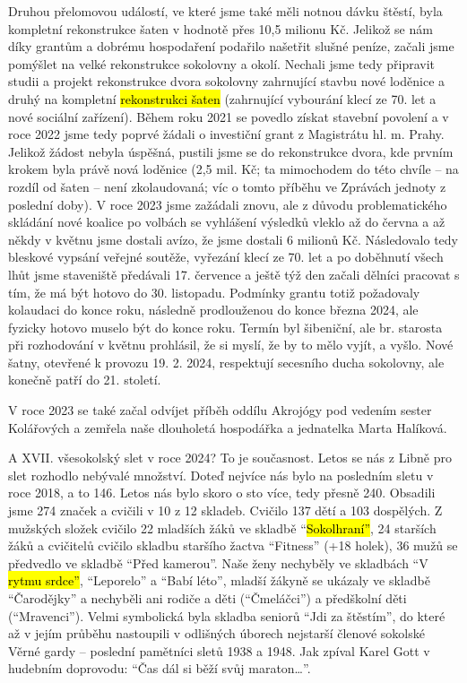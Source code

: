 Druhou přelomovou událostí, ve které jsme také měli notnou dávku štěstí,
byla kompletní rekonstrukce šaten v hodnotě přes 10,5 milionu Kč.
Jelikož se nám díky grantům a dobrému hospodaření podařilo našetřit
slušné peníze, začali jsme pomýšlet na velké rekonstrukce sokolovny a
okolí. Nechali jsme tedy připravit studii a projekt rekonstrukce dvora
sokolovny zahrnující stavbu nové loděnice a druhý na kompletní
\hl{rekonstrukci šaten} (zahrnující vybourání klecí ze 70. let a nové
sociální zařízení). Během roku 2021 se povedlo získat stavební povolení
a v roce 2022 jsme tedy poprvé žádali o investiční grant z Magistrátu
hl. m. Prahy. Jelikož žádost nebyla úspěšná, pustili jsme se do
rekonstrukce dvora, kde prvním krokem byla právě nová loděnice (2,5 mil.
Kč; ta mimochodem do této chvíle -- na rozdíl od šaten -- není
zkolaudovaná; víc o tomto příběhu ve Zprávách jednoty z poslední doby).
V roce 2023 jsme zažádali znovu, ale z důvodu problematického skládání
nové koalice po volbách se vyhlášení výsledků vleklo až do června a až
někdy v květnu jsme dostali avízo, že jsme dostali 6 milionů Kč.
Následovalo tedy bleskové vypsání veřejné soutěže, vyřezání klecí ze 70.
let a po doběhnutí všech lhůt jsme staveniště předávali 17. července a
ještě týž den začali dělníci pracovat s tím, že má být hotovo do 30.
listopadu. Podmínky grantu totiž požadovaly kolaudaci do konce roku,
následně prodlouženou do konce března 2024, ale fyzicky hotovo muselo
být do konce roku. Termín byl šibeniční, ale br. starosta při
rozhodování v květnu prohlásil, že si myslí, že by to mělo vyjít, a
vyšlo. Nové šatny, otevřené k provozu 19. 2. 2024, respektují secesního
ducha sokolovny, ale konečně patří do 21. století.

V roce 2023 se také začal odvíjet příběh oddílu Akrojógy pod vedením
sester Kolářových a zemřela naše dlouholetá hospodářka a jednatelka
Marta Halíková.

A XVII. všesokolský slet v roce 2024? To je současnost. Letos se nás z
Libně pro slet rozhodlo nebývalé množství. Doteď nejvíce nás bylo na
posledním sletu v roce 2018, a to 146. Letos nás bylo skoro o sto více,
tedy přesně 240. Obsadili jsme 274 značek a cvičili v 10 z 12 skladeb.
Cvičilo 137 dětí a 103 dospělých. Z mužských složek cvičilo 22 mladších
žáků ve skladbě ``\hl{Sokolhraní''}, 24 starších žáků a cvičitelů
cvičilo skladbu staršího žactva ``Fitness'' (+18 holek), 36 mužů se
předvedlo ve skladbě ``Před kamerou''. Naše ženy nechyběly ve skladbách
``V \hl{rytmu srdce''}, ``Leporelo'' a ``Babí léto'', mladší žákyně se
ukázaly ve skladbě ``Čarodějky'' a nechyběli ani rodiče a děti
(``Čmeláčci'') a předškolní děti (``Mravenci''). Velmi symbolická byla
skladba seniorů ``Jdi za štěstím'', do které až v jejím průběhu
nastoupili v odlišných úborech nejstarší členové sokolské Věrné gardy --
poslední pamětníci sletů 1938 a 1948. Jak zpíval Karel Gott v hudebním
doprovodu: ``Čas dál si běží svůj maraton\ldots''.

